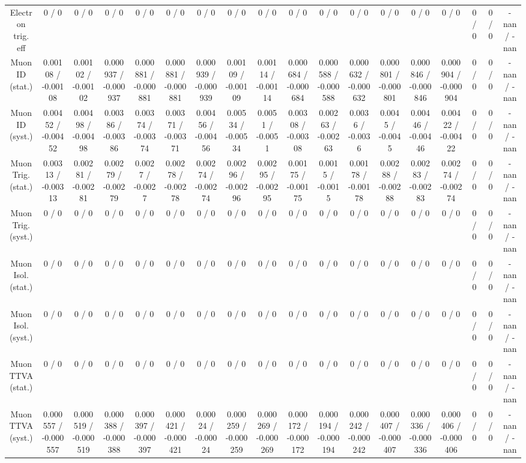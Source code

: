 \documentclass[10pt]{article}
\begin{document}
\begin{table}[htbp]
\begin{center}
\begin{tabular}{|c|c|c|c|c|c|c|c|c|c|c|c|c|c|c|c|c|c|}
  Electron trig. eff & 0 / 0 & 0 / 0 & 0 / 0 & 0 / 0 & 0 / 0 & 0 / 0 & 0 / 0 & 0 / 0 & 0 / 0 & 0 / 0 & 0 / 0 & 0 / 0 & 0 / 0 & 0 / 0 & 0 / 0 & 0 / 0 & -nan / -nan \\ 
  Muon ID (stat.) & 0.00108 / -0.00108 & 0.00102 / -0.00102 & 0.000937 / -0.000937 & 0.000881 / -0.000881 & 0.000881 / -0.000881 & 0.000939 / -0.000939 & 0.00109 / -0.00109 & 0.00114 / -0.00114 & 0.000684 / -0.000684 & 0.000588 / -0.000588 & 0.000632 / -0.000632 & 0.000801 / -0.000801 & 0.000846 / -0.000846 & 0.000904 / -0.000904 & 0 / 0 & 0 / 0 & -nan / -nan \\ 
  Muon ID (syst.) & 0.00452 / -0.00452 & 0.00498 / -0.00498 & 0.00386 / -0.00386 & 0.00374 / -0.00374 & 0.00371 / -0.00371 & 0.00456 / -0.00456 & 0.00534 / -0.00534 & 0.0051 / -0.0051 & 0.00308 / -0.00308 & 0.00263 / -0.00263 & 0.0036 / -0.0036 & 0.0045 / -0.0045 & 0.00446 / -0.00446 & 0.00422 / -0.00422 & 0 / 0 & 0 / 0 & -nan / -nan \\ 
  Muon Trig. (stat.) & 0.00313 / -0.00313 & 0.00281 / -0.00281 & 0.00279 / -0.00279 & 0.0027 / -0.0027 & 0.00278 / -0.00278 & 0.00274 / -0.00274 & 0.00296 / -0.00296 & 0.00295 / -0.00295 & 0.00175 / -0.00175 & 0.0015 / -0.0015 & 0.00178 / -0.00178 & 0.00288 / -0.00288 & 0.00283 / -0.00283 & 0.00274 / -0.00274 & 0 / 0 & 0 / 0 & -nan / -nan \\ 
  Muon Trig. (syst.) & 0 / 0 & 0 / 0 & 0 / 0 & 0 / 0 & 0 / 0 & 0 / 0 & 0 / 0 & 0 / 0 & 0 / 0 & 0 / 0 & 0 / 0 & 0 / 0 & 0 / 0 & 0 / 0 & 0 / 0 & 0 / 0 & -nan / -nan \\ 
  Muon Isol. (stat.) & 0 / 0 & 0 / 0 & 0 / 0 & 0 / 0 & 0 / 0 & 0 / 0 & 0 / 0 & 0 / 0 & 0 / 0 & 0 / 0 & 0 / 0 & 0 / 0 & 0 / 0 & 0 / 0 & 0 / 0 & 0 / 0 & -nan / -nan \\ 
  Muon Isol. (syst.) & 0 / 0 & 0 / 0 & 0 / 0 & 0 / 0 & 0 / 0 & 0 / 0 & 0 / 0 & 0 / 0 & 0 / 0 & 0 / 0 & 0 / 0 & 0 / 0 & 0 / 0 & 0 / 0 & 0 / 0 & 0 / 0 & -nan / -nan \\ 
  Muon TTVA (stat.) & 0 / 0 & 0 / 0 & 0 / 0 & 0 / 0 & 0 / 0 & 0 / 0 & 0 / 0 & 0 / 0 & 0 / 0 & 0 / 0 & 0 / 0 & 0 / 0 & 0 / 0 & 0 / 0 & 0 / 0 & 0 / 0 & -nan / -nan \\ 
  Muon TTVA (syst.) & 0.000557 / -0.000557 & 0.000519 / -0.000519 & 0.000388 / -0.000388 & 0.000397 / -0.000397 & 0.000421 / -0.000421 & 0.00024 / -0.00024 & 0.000259 / -0.000259 & 0.000269 / -0.000269 & 0.000172 / -0.000172 & 0.000194 / -0.000194 & 0.000242 / -0.000242 & 0.000407 / -0.000407 & 0.000336 / -0.000336 & 0.000406 / -0.000406 & 0 / 0 & 0 / 0 & -nan / -nan \\ 

\end{tabular}
\end{center}
\end{table}
\end{document}
